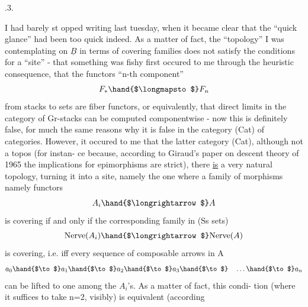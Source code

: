 .3. 

 I had barely st opped writing last tuesday,  when it became clear 
that the ``quick glance'' had been too quick indeed.  As a matter
of fact,  the ``topology'' I was contemplating on $\underline{B}$ in terms of covering
families does not satisfy the conditions for a ``site'' -  that something
was fishy first occured to me through the heuristic consequence,  that
the functors  ``n-th component''
\[ F_{*} \hand{$\longmapsto$} F_{n} \]
from  stacks to sets are fiber functors,  or equivalently, that
direct limits in the category of Gr-stacks can be computed componentwise
-  now this is definitely false,  for much the same reasons why it is
false  in the category (Cat) of categories.  However,  it occured
to me that  the latter category (Cat),  although not a topos (for instan-%
ce because, according to Giraud's paper on descent theory of 1965
the implications for epimorphisms
are strict),  there \uline{is} a very natural topology,   turning it into
a site,  namely the one where a family of morphisms namely functors
\[ A_{i} \hand{$\longrightarrow$} A \]
is covering if and only if the corresponding family in (Ss sets)
\[ \mathrm{Nerve}(A_{i}) \hand{$\longrightarrow$} \mathrm{Nerve}(A) \]
is covering,  i.e. iff every  sequence of composable arrows in A
\[ a_{0} \hand{$\to$} a_{1} \hand{$\to$} a_{2} \hand{$\to$} a_{3} \hand{$\to$} \quad \dots \hand{$\to$} a_{n} \]
can be lifted  to one among the $A_{i}$'s.  As a matter of fact,  this condi-%
tion (where it suffices to take n=2,  visibly)  is equivalent (according
